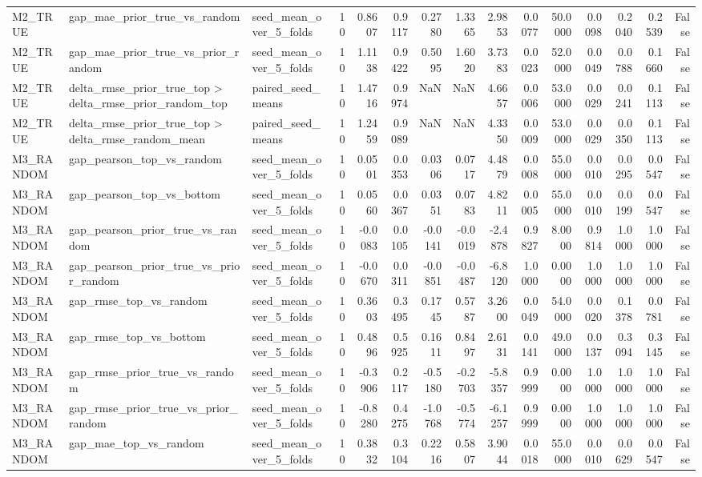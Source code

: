 \begin{tabular}{lllrrrrrrrrrrrr}
M2_TRUE & gap_mae_prior_true_vs_random & seed_mean_over_5_folds & 10 & 0.8607 & 0.9117 & 0.2780 & 1.3365 & 2.9853 & 0.0077 & 50.0000 & 0.0098 & 0.2040 & 0.2539 & False \\
M2_TRUE & gap_mae_prior_true_vs_prior_random & seed_mean_over_5_folds & 10 & 1.1138 & 0.9422 & 0.5095 & 1.6020 & 3.7383 & 0.0023 & 52.0000 & 0.0049 & 0.0788 & 0.1660 & False \\
M2_TRUE & delta_rmse_prior_true_top > delta_rmse_prior_random_top & paired_seed_means & 10 & 1.4716 & 0.9974 & NaN & NaN & 4.6657 & 0.0006 & 53.0000 & 0.0029 & 0.0241 & 0.1113 & False \\
M2_TRUE & delta_rmse_prior_true_top > delta_rmse_random_mean & paired_seed_means & 10 & 1.2459 & 0.9089 & NaN & NaN & 4.3350 & 0.0009 & 53.0000 & 0.0029 & 0.0350 & 0.1113 & False \\
M3_RANDOM & gap_pearson_top_vs_random & seed_mean_over_5_folds & 10 & 0.0501 & 0.0353 & 0.0306 & 0.0717 & 4.4879 & 0.0008 & 55.0000 & 0.0010 & 0.0295 & 0.0547 & False \\
M3_RANDOM & gap_pearson_top_vs_bottom & seed_mean_over_5_folds & 10 & 0.0560 & 0.0367 & 0.0351 & 0.0783 & 4.8211 & 0.0005 & 55.0000 & 0.0010 & 0.0199 & 0.0547 & False \\
M3_RANDOM & gap_pearson_prior_true_vs_random & seed_mean_over_5_folds & 10 & -0.0083 & 0.0105 & -0.0141 & -0.0019 & -2.4878 & 0.9827 & 8.0000 & 0.9814 & 1.0000 & 1.0000 & False \\
M3_RANDOM & gap_pearson_prior_true_vs_prior_random & seed_mean_over_5_folds & 10 & -0.0670 & 0.0311 & -0.0851 & -0.0487 & -6.8120 & 1.0000 & 0.0000 & 1.0000 & 1.0000 & 1.0000 & False \\
M3_RANDOM & gap_rmse_top_vs_random & seed_mean_over_5_folds & 10 & 0.3603 & 0.3495 & 0.1745 & 0.5787 & 3.2600 & 0.0049 & 54.0000 & 0.0020 & 0.1378 & 0.0781 & False \\
M3_RANDOM & gap_rmse_top_vs_bottom & seed_mean_over_5_folds & 10 & 0.4896 & 0.5925 & 0.1611 & 0.8497 & 2.6131 & 0.0141 & 49.0000 & 0.0137 & 0.3094 & 0.3145 & False \\
M3_RANDOM & gap_rmse_prior_true_vs_random & seed_mean_over_5_folds & 10 & -0.3906 & 0.2117 & -0.5180 & -0.2703 & -5.8357 & 0.9999 & 0.0000 & 1.0000 & 1.0000 & 1.0000 & False \\
M3_RANDOM & gap_rmse_prior_true_vs_prior_random & seed_mean_over_5_folds & 10 & -0.8280 & 0.4275 & -1.0768 & -0.5774 & -6.1257 & 0.9999 & 0.0000 & 1.0000 & 1.0000 & 1.0000 & False \\
M3_RANDOM & gap_mae_top_vs_random & seed_mean_over_5_folds & 10 & 0.3832 & 0.3104 & 0.2216 & 0.5807 & 3.9044 & 0.0018 & 55.0000 & 0.0010 & 0.0629 & 0.0547 & False \\

\end{tabular}
